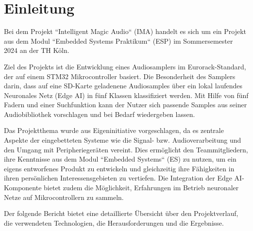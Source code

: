 \newpage
\section{Einleitung}

Bei dem Projekt ``Intelligent Magic Audio`` (IMA) handelt es sich um ein Projekt aus dem Modul ``Embedded Systems Praktikum`` (ESP) im Sommersemester 2024 an der TH Köln.

Ziel des Projekts ist die Entwicklung eines Audiosamplers im Eurorack-Standard, der auf einem STM32 Mikrocontroller basiert. Die Besonderheit des Samplers darin, dass auf eine SD-Karte geladenene Audiosamples über ein lokal laufendes Neuronales Netz (Edge AI) in fünf Klassen klassifiziert werden. Mit Hilfe von fünf Fadern und einer Suchfunktion kann der Nutzer sich passende Samples aus seiner Audiobibliothek vorschlagen und bei Bedarf wiedergeben lassen. 

Das Projektthema wurde aus Eigeninitiative vorgeschlagen, da es zentrale Aspekte der eingebetteten Systeme wie die Signal- bzw. Audioverarbeitung und den Umgang mit Peripheriegeräten vereint. Dies ermöglicht den Teammitgliedern, ihre Kenntnisse aus dem Modul ``Embedded Systems`` (ES) zu nutzen, um ein eigens entworfenes Produkt zu entwickeln und gleichzeitig ihre Fähigkeiten in ihren persönlichen Interessensgebieten zu vertiefen. Die Integration der Edge AI-Komponente bietet zudem die Möglichkeit, Erfahrungen im Betrieb neuronaler Netze auf Mikrocontrollern zu sammeln.

Der folgende Bericht bietet eine detaillierte Übersicht über den Projektverlauf, die verwendeten Technologien, die Herausforderungen und die Ergebnisse.
